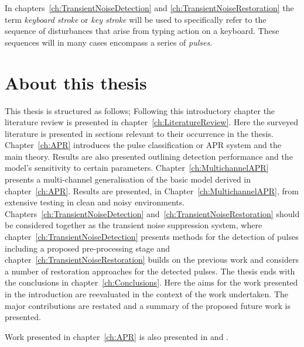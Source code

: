 In chapters~\ref{ch:TransientNoiseDetection} and \ref{ch:TransientNoiseRestoration} the term \emph{keyboard stroke} or \emph{key stroke} will be used to specifically refer to the sequence of disturbances that arise from typing action on a keyboard. These sequences will in many cases encompass a series of \emph{pulses}.


\section{About this thesis}
This thesis is structured as follows; Following this introductory chapter the literature review is presented in chapter~\ref{ch:LiteratureReview}. Here the surveyed literature is presented in sections relevant to their occurrence in the thesis. Chapter~\ref{ch:APR} introduces the pulse classification or APR system and the main theory. Results are also presented outlining detection performance and the model's sensitivity to certain parameters. Chapter~\ref{ch:MultichannelAPR} presents a multi-channel generalisation of the basic model derived in chapter~\ref{ch:APR}. Results are presented, in Chapter~\ref{ch:MultichannelAPR}, from extensive testing in clean and noisy environments. Chapters~\ref{ch:TransientNoiseDetection} and~\ref{ch:TransientNoiseRestoration} should be considered together as the transient noise suppression system, where chapter~\ref{ch:TransientNoiseDetection} presents methods for the detection of pulses including a proposed pre-processing stage and chapter~\ref{ch:TransientNoiseRestoration} builds on the previous work and considers a number of restoration approaches for the detected pulses. The thesis ends with the conclusions in chapter~\ref{ch:Conclusions}. Here the aims for the work presented in the introduction are reevaluated in the context of the work undertaken. The major contributions are restated and a summary of the proposed future work is presented.

Work presented in chapter~\ref{ch:APR} is also presented in \cite{Christensen2011} and \cite{US20110316784}.


